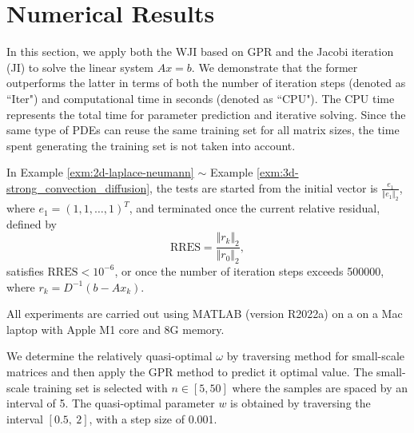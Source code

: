 \documentclass[preprint,review,sort&compress,3p]{elsarticle}
\begin{document}
\section{Numerical Results}
\label{Experiments}

In this section, we apply both the { WJI} based on GPR and the Jacobi iteration (JI) to solve the linear system $Ax = b$. 
We demonstrate that the former outperforms the latter in terms of both the number of iteration steps (denoted as  ``Iter") and computational time in seconds (denoted as ``CPU"). { The CPU time represents the total time for parameter prediction and iterative solving. Since the same type of PDEs can reuse the same training set for all matrix sizes, the time spent generating the training set is not taken into account.}



In Example \ref{exm:2d-laplace-neumann} $\sim$ Example \ref{exm:3d-strong_convection_diffusion}, the tests are started from the initial vector is $\frac{e_1}{\Vert e_1\Vert_2}$, where $e_1 = (1,1,\dots,1)^T$, and terminated once the current relative residual, defined by
$$
\text{RRES} = \frac{\Vert r_k\Vert_2}{\Vert r_0\Vert_2},
$$
satisfies $\text{RRES} < 10^{-6}$, or once the number of iteration steps exceeds 500000, where $r_k =D^{-1} (b-Ax_k)$.


All experiments are carried out using MATLAB (version R2022a) on a 
on a Mac laptop with Apple M1 core and 8G memory.

We determine the relatively quasi-optimal $\omega$ by traversing method for small-scale matrices and then apply the GPR method to predict it optimal value. 
The small-scale training set is selected with $n \in [5,50]$ where the samples are spaced by an interval of 5.
The quasi-optimal parameter $w$ is obtained by traversing the interval $[0.5,~2]$, with a step size of 0.001. 
\end{document}
